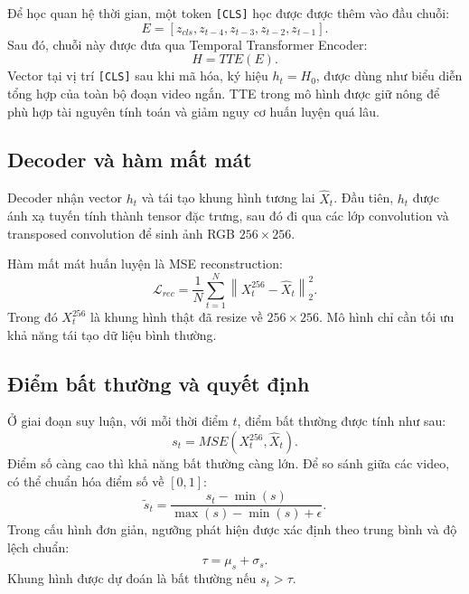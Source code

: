Để học quan hệ thời gian, một token \texttt{[CLS]} học được được thêm vào đầu chuỗi:
\begin{equation}
E = [z_{cls}, z_{t-4}, z_{t-3}, z_{t-2}, z_{t-1}].
\end{equation}
Sau đó, chuỗi này được đưa qua Temporal Transformer Encoder:
\begin{equation}
H = TTE(E).
\end{equation}
Vector tại vị trí \texttt{[CLS]} sau khi mã hóa, ký hiệu $h_t = H_0$, được dùng như biểu diễn tổng hợp của toàn bộ đoạn video ngắn. TTE trong mô hình được giữ nông để phù hợp tài nguyên tính toán và giảm nguy cơ huấn luyện quá lâu.

\subsection{Decoder và hàm mất mát}

Decoder nhận vector $h_t$ và tái tạo khung hình tương lai $\hat{X}_t$. Đầu tiên, $h_t$ được ánh xạ tuyến tính thành tensor đặc trưng, sau đó đi qua các lớp convolution và transposed convolution để sinh ảnh RGB $256 \times 256$.

Hàm mất mát huấn luyện là MSE reconstruction:
\begin{equation}
\mathcal{L}_{rec} = \frac{1}{N}\sum_{t=1}^{N}\left\|X_t^{256} - \hat{X}_t\right\|_2^2.
\end{equation}
Trong đó $X_t^{256}$ là khung hình thật đã resize về $256 \times 256$. Mô hình chỉ cần tối ưu khả năng tái tạo dữ liệu bình thường.

\subsection{Điểm bất thường và quyết định}

Ở giai đoạn suy luận, với mỗi thời điểm $t$, điểm bất thường được tính như sau:
\begin{equation}
s_t = MSE(X_t^{256}, \hat{X}_t).
\end{equation}
Điểm số càng cao thì khả năng bất thường càng lớn. Để so sánh giữa các video, có thể chuẩn hóa điểm số về $[0,1]$:
\begin{equation}
\tilde{s}_t = \frac{s_t-\min(s)}{\max(s)-\min(s)+\epsilon}.
\end{equation}
Trong cấu hình đơn giản, ngưỡng phát hiện được xác định theo trung bình và độ lệch chuẩn:
\begin{equation}
\tau = \mu_s + \sigma_s.
\end{equation}
Khung hình được dự đoán là bất thường nếu $s_t > \tau$.

